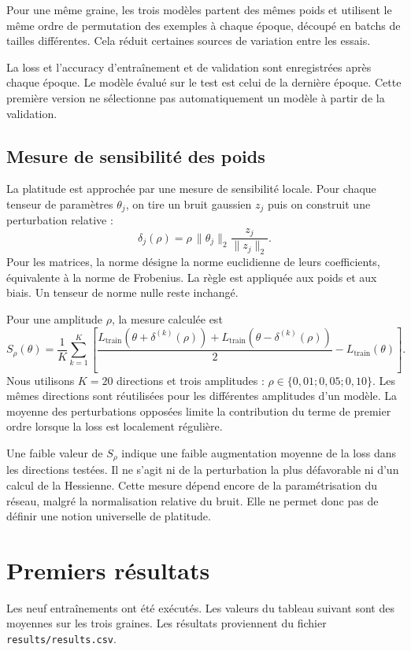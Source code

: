 \documentclass[11pt,a4paper]{article}
\begin{document}
Pour une même graine, les trois modèles partent des mêmes poids et utilisent le même ordre de permutation des exemples à chaque époque, découpé en batchs de tailles différentes. Cela réduit certaines sources de variation entre les essais.

La loss et l'accuracy d'entraînement et de validation sont enregistrées après chaque époque. Le modèle évalué sur le test est celui de la dernière époque. Cette première version ne sélectionne pas automatiquement un modèle à partir de la validation.

\subsection{Mesure de sensibilité des poids}

La platitude est approchée par une mesure de sensibilité locale. Pour chaque tenseur de paramètres $\theta_j$, on tire un bruit gaussien $z_j$ puis on construit une perturbation relative :
\[
\delta_j(\rho)=\rho\,\|\theta_j\|_2\frac{z_j}{\|z_j\|_2}.
\]
Pour les matrices, la norme désigne la norme euclidienne de leurs coefficients, équivalente à la norme de Frobenius. La règle est appliquée aux poids et aux biais. Un tenseur de norme nulle reste inchangé.

Pour une amplitude $\rho$, la mesure calculée est
\[
S_\rho(\theta)=\frac{1}{K}\sum_{k=1}^{K}
\left[
\frac{L_{\mathrm{train}}(\theta+\delta^{(k)}(\rho))
+L_{\mathrm{train}}(\theta-\delta^{(k)}(\rho))}{2}
-L_{\mathrm{train}}(\theta)
\right].
\]
Nous utilisons $K=20$ directions et trois amplitudes : $\rho\in\{0{,}01;0{,}05;0{,}10\}$. Les mêmes directions sont réutilisées pour les différentes amplitudes d'un modèle. La moyenne des perturbations opposées limite la contribution du terme de premier ordre lorsque la loss est localement régulière.

Une faible valeur de $S_\rho$ indique une faible augmentation moyenne de la loss dans les directions testées. Il ne s'agit ni de la perturbation la plus défavorable ni d'un calcul de la Hessienne. Cette mesure dépend encore de la paramétrisation du réseau, malgré la normalisation relative du bruit. Elle ne permet donc pas de définir une notion universelle de platitude.

\section{Premiers résultats}

Les neuf entraînements ont été exécutés. Les valeurs du tableau suivant sont des moyennes sur les trois graines. Les résultats proviennent du fichier \texttt{results/results.csv}.
\end{document}
